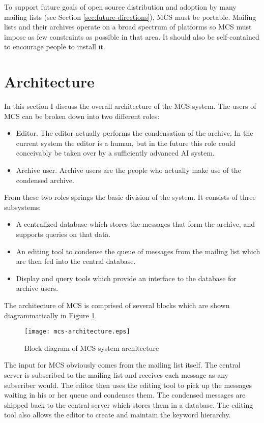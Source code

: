 To support future goals of open source distribution and adoption by many
mailing lists (see Section \ref{sec:future-directions}), MCS must be portable.
Mailing lists and their archives operate on a broad spectrum of platforms so
MCS must impose as few constraints as possible in that area. It should also be
self-contained to encourage people to install it.

\section{Architecture}
In this section I discuss the overall architecture of the MCS system. The users
of MCS can be broken down into two different roles:

\begin{itemize}
\item Editor. The editor actually performs the condensation of the archive. In
  the current system the editor is a human, but in the future this role could
  conceivably be taken over by a sufficiently advanced AI system.
\item Archive user. Archive users are the people who actually make use of the
  condensed archive.
\end{itemize}

From these two roles springs the basic division of the system. It consists of
three subsystems:

\begin{itemize}
\item A centralized database which stores the messages that form the archive,
  and supports queries on that data.
\item An editing tool to condense the queue of messages from the mailing list
  which are then fed into the central database.
\item Display and query tools which provide an interface to the database for
  archive users.
\end{itemize}

The architecture of MCS is comprised of several blocks which are shown
diagrammatically in Figure \ref{fig:mcs-architecture}.

\begin{figure}[htbp]
  \centering
  \texttt{[image: mcs-architecture.eps]}
  \caption{Block diagram of MCS system architecture}
  \label{fig:mcs-architecture}
\end{figure}

The input for MCS obviously comes from the mailing list itself. The central
server is subscribed to the mailing list and receives each message as any
subscriber would. The editor then uses the editing tool to pick up the messages
waiting in his or her queue and condenses them. The condensed messages are
shipped back to the central server which stores them in a database. The editing
tool also allows the editor to create and maintain the keyword hierarchy.

